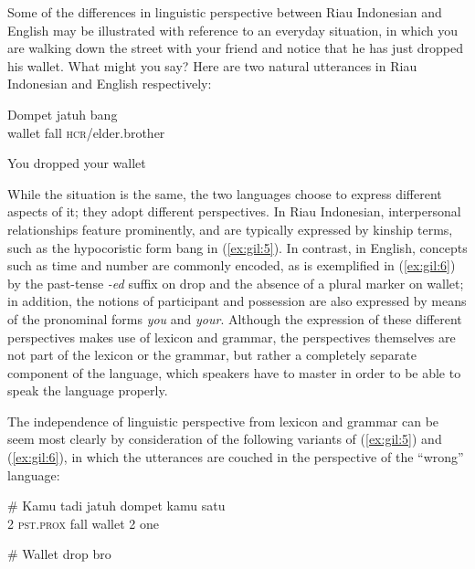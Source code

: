\documentclass[output=paper,colorlinks,citecolor=brown
]{langscibook}
\begin{document}
Some of the differences in linguistic perspective between Riau Indonesian and English may be illustrated with reference to an everyday situation, in which you are walking down the street with your friend and notice that he has just dropped his wallet.  What might you say?  Here are two natural utterances in Riau Indonesian and English respectively:

\ea \label{ex:gil:5}
\gll Dompet	jatuh	bang \\
    wallet	fall	\textsc{hcr}/elder.brother \\
\z

\ea \label{ex:gil:6}
You dropped your wallet \\
\z

While the situation is the same, the two languages choose to express different aspects of it; they adopt different perspectives. In Riau Indonesian, interpersonal relationships feature prominently, and are typically expressed by kinship terms, such as the hypocoristic form bang in (\ref{ex:gil:5}).  In contrast, in English, concepts such as time and number are commonly encoded, as is exemplified in (\ref{ex:gil:6}) by the past-tense \emph{-ed} suffix on drop and the absence of a plural marker on wallet; in addition, the notions of participant and possession are also expressed by means of the pronominal forms \emph{you} and \emph{your}. Although the expression of these different perspectives makes use of lexicon and grammar, the perspectives themselves are not part of the lexicon or the grammar, but rather a completely separate component of the language, which speakers have to master in order to be able to speak the language properly.  

The independence of linguistic perspective from lexicon and grammar can be seem most clearly by consideration of the following variants of (\ref{ex:gil:5}) and (\ref{ex:gil:6}), in which the utterances are couched in the perspective of the ``wrong'' language:

\ea \label{ex:gil:7}
\gll \# Kamu	tadi	jatuh	dompet	kamu	satu \\
    { } 2	\textsc{pst.prox}	fall	wallet	2	one \\
\z

\ea \label{ex:gil:8}
\# Wallet drop bro \\
\z
\end{document}

